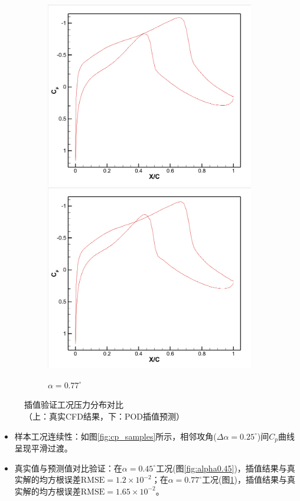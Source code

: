 \begin{figure}[H]
\begin{subfigure}[b]{0.45\textwidth}
\includegraphics[width=0.9\linewidth]{0.77真实值.png} \\
\includegraphics[width=0.9\linewidth]{0.77插值.png}
\caption{\songti$\alpha=0.77^\circ$}
\label{fig:alpha0.77}
\end{subfigure}
\caption{\songti 插值验证工况压力分布对比\\
{\songti\footnotesize （上：真实CFD结果，下：POD插值预测）}}
\label{fig:interp_validation}
\end{figure}

\begin{itemize}
\item {样本工况连续性}：如图\ref{fig:cp_samples}所示，相邻攻角($\Delta\alpha=0.25^\circ$)间$C_p$曲线呈现平滑过渡。

\item {真实值与预测值对比验证}：在$\alpha=0.45^\circ$工况(图\ref{fig:alpha0.45})，插值结果与真实解的均方根误差$\text{RMSE}=1.2\times10^{-2}$；在$\alpha=0.77^\circ$工况(图\ref{fig:alpha0.77})，插值结果与真实解的均方根误差$\text{RMSE}=1.65\times10^{-2}$。
\end{itemize}

